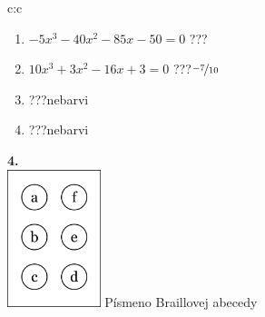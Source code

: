 \documentclass[10pt]{report}
\begin{document}
\begin{tabular}{c:c}
\begin{minipage}[c][99mm][t]{0.49\linewidth}
\begin{center}
\begin{minipage}{0.77\linewidth}
\begin{center}
\begin{varwidth}{\textwidth}
\begin{enumerate}
\item $-5x^3-40x^2-85x-50=0$\quad \dotfill\; ???\;\dotfill {}
\item $10x^3+3x^2-16x+3=0$\quad \dotfill\; ???\;\dotfill \quad $\nicefrac{-7}{10}$
\item \quad \dotfill\; ???\;\dotfill \quad nebarvi
\item \quad \dotfill\; ???\;\dotfill \quad nebarvi
\end{enumerate}
\end{varwidth}
\end{center}
\end{minipage}
\begin{minipage}{0.20\linewidth}
\begin{center}
{\Huge\bfseries 4.} \\[2mm]
\includegraphics[height=40mm]{../images/braille.png}
{\small Písmeno Braillovej abecedy}
\end{center}
\end{minipage}
\end{center}
\end{minipage}

\end{tabular}
\clearpage
\thispagestyle{empty}
\end{document}
